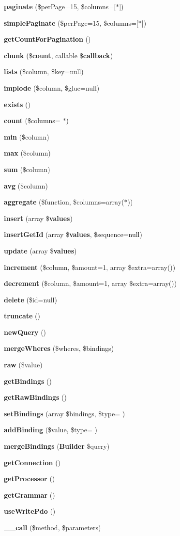 \begin{DoxyCompactItemize}
\item 
{\bf paginate} (\$per\+Page=15, \$columns=[\textquotesingle{}$\ast$\textquotesingle{}])
\item 
{\bf simple\+Paginate} (\$per\+Page=15, \$columns=[\textquotesingle{}$\ast$\textquotesingle{}])
\item 
{\bf get\+Count\+For\+Pagination} ()
\item 
{\bf chunk} (\${\bf count}, callable \${\bf callback})
\item 
{\bf lists} (\$column, \$key=null)
\item 
{\bf implode} (\$column, \$glue=null)
\item 
{\bf exists} ()
\item 
{\bf count} (\$columns= \textquotesingle{}$\ast$\textquotesingle{})
\item 
{\bf min} (\$column)
\item 
{\bf max} (\$column)
\item 
{\bf sum} (\$column)
\item 
{\bf avg} (\$column)
\item 
{\bf aggregate} (\$function, \$columns=array(\textquotesingle{}$\ast$\textquotesingle{}))
\item 
{\bf insert} (array \${\bf values})
\item 
{\bf insert\+Get\+Id} (array \${\bf values}, \$sequence=null)
\item 
{\bf update} (array \${\bf values})
\item 
{\bf increment} (\$column, \$amount=1, array \$extra=array())
\item 
{\bf decrement} (\$column, \$amount=1, array \$extra=array())
\item 
{\bf delete} (\$id=null)
\item 
{\bf truncate} ()
\item 
{\bf new\+Query} ()
\item 
{\bf merge\+Wheres} (\$wheres, \$bindings)
\item 
{\bf raw} (\$value)
\item 
{\bf get\+Bindings} ()
\item 
{\bf get\+Raw\+Bindings} ()
\item 
{\bf set\+Bindings} (array \$bindings, \$type= \textquotesingle{})
\item 
{\bf add\+Binding} (\$value, \$type= \textquotesingle{})
\item 
{\bf merge\+Bindings} ({\bf Builder} \$query)
\item 
{\bf get\+Connection} ()
\item 
{\bf get\+Processor} ()
\item 
{\bf get\+Grammar} ()
\item 
{\bf use\+Write\+Pdo} ()
\item 
{\bf \+\_\+\+\_\+call} (\$method, \$parameters)
\end{DoxyCompactItemize}
